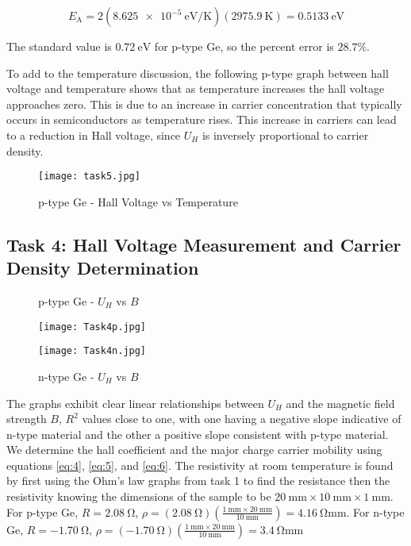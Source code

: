 \documentclass[11pt]{article}
\begin{document}
	\begin{equation}
		E_\mathrm{A} = 2(\qty{8.625e-5}{\electronvolt\per\kelvin})(\qty{2975.9}{\kelvin}) = \qty{0.5133}{\electronvolt} \label{eq:13}
	\end{equation}
	
	The standard value is $\qty{0.72}{\electronvolt}$ for p-type Ge, so the percent error is $28.7\%$.
	
	To add to the temperature discussion, the following p-type graph between hall voltage and temperature shows that as temperature increases the hall voltage approaches zero. This is due to an increase in carrier concentration that typically occurs in semiconductors as temperature rises. This increase in carriers can lead to a reduction in Hall voltage, since $U_H$ is inversely proportional to carrier density.
	
	\begin{figure}[htbp]
		\centering
		\caption{p-type Ge - Hall Voltage vs Temperature}
		\texttt{[image: task5.jpg]}
	\end{figure}
	
\clearpage
	
	\subsection{Task 4: Hall Voltage Measurement and Carrier Density Determination}
	
	\begin{figure}[h!]
		\centering
		\begin{minipage}{0.45\textwidth}
			\centering
			\caption{p-type Ge - $U_H$ vs $B$}
			\texttt{[image: Task4p.jpg]}
			\label{fig:image8}
		\end{minipage}\hfill
		\begin{minipage}{0.45\textwidth}
			\centering
			\caption{n-type Ge - $U_H$ vs $B$}
			\texttt{[image: Task4n.jpg]}
			\label{fig:image9}
		\end{minipage}
	\end{figure}
	
	The graphs exhibit clear linear relationships between \(U_H\) and the magnetic field strength \(B\), $R^2$ values close to one, with one having a negative slope indicative of n-type material and the other a positive slope consistent with p-type material. We determine the hall coefficient and the major charge carrier mobility using equations \ref{eq:4}, \ref{eq:5}, and \ref{eq:6}. The resistivity at room temperature is found by first using the Ohm's law graphs from task 1 to find the resistance then the resistivity knowing the dimensions of the sample to be $\qty{20}{\milli\meter} \times \qty{10}{\milli\meter} \times \qty{1}{\milli\meter}$. For p-type Ge, $R = \qty{2.08}{\ohm}$, $\rho = (\qty{2.08}{\ohm})\left( \frac{\qty{1}{\milli\meter} \times \qty{20}{\milli\meter}}{\qty{10}{\milli\meter}} \right) = \qty{4.16}{\ohm\milli\meter}$. For n-type Ge, $R = \qty{-1.70}{\ohm}$, $\rho = (\qty{-1.70}{\ohm})\left( \frac{\qty{1}{\milli\meter} \times \qty{20}{\milli\meter}}{\qty{10}{\milli\meter}} \right) = \qty{3.4}{\ohm\milli\meter}$
\end{document}

